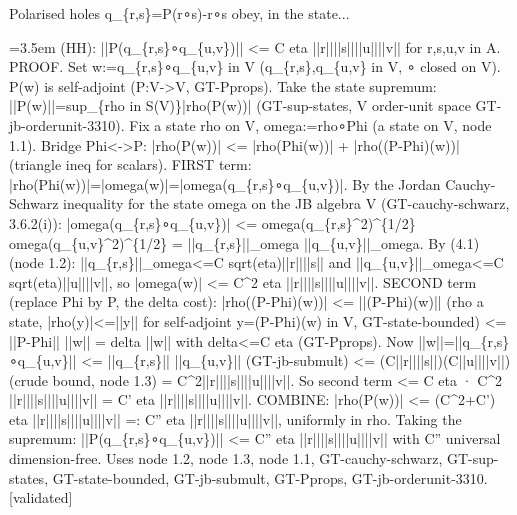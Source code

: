 \documentclass{article}
\newcommand{\step}[1]{\par\noindent\hangindent=3.5em\hangafter=1%
  \makebox[3.5em][l]{\textbf{#1.}}}
\newcommand{\steptag}[1]{\hfill{\small\textsf{[#1]}}}
\begin{document}
\begin{proofbox}{Polarised holes q\_\{r,s\}=P(r∘s)-r∘s obey, in the state...}
\step{1.4} (HH): ||P(q\_\{r,s\}∘q\_\{u,v\})|| <= C eta ||r||||s||||u||||v|| for r,s,u,v in A. PROOF. Set w:=q\_\{r,s\}∘q\_\{u,v\} in V (q\_\{r,s\},q\_\{u,v\} in V, ∘ closed on V). P(w) is self-adjoint (P:V->V, GT-Pprops). Take the state supremum: ||P(w)||=sup\_\{rho in S(V)\}|rho(P(w))| (GT-sup-states, V order-unit space GT-jb-orderunit-3310). Fix a state rho on V, omega:=rho∘Phi (a state on V, node 1.1). Bridge Phi<->P: |rho(P(w))| <= |rho(Phi(w))| + |rho((P-Phi)(w))| (triangle ineq for scalars). FIRST term: |rho(Phi(w))|=|omega(w)|=|omega(q\_\{r,s\}∘q\_\{u,v\})|. By the Jordan Cauchy-Schwarz inequality for the state omega on the JB algebra V (GT-cauchy-schwarz, 3.6.2(i)): |omega(q\_\{r,s\}∘q\_\{u,v\})| <= omega(q\_\{r,s\}\textasciicircum{}2)\textasciicircum{}\{1/2\} omega(q\_\{u,v\}\textasciicircum{}2)\textasciicircum{}\{1/2\} = ||q\_\{r,s\}||\_omega ||q\_\{u,v\}||\_omega. By (4.1) (node 1.2): ||q\_\{r,s\}||\_omega<=C sqrt(eta)||r||||s|| and ||q\_\{u,v\}||\_omega<=C sqrt(eta)||u||||v||, so |omega(w)| <= C\textasciicircum{}2 eta ||r||||s||||u||||v||. SECOND term (replace Phi by P, the delta cost): |rho((P-Phi)(w))| <= ||(P-Phi)(w)|| (rho a state, |rho(y)|<=||y|| for self-adjoint y=(P-Phi)(w) in V, GT-state-bounded) <= ||P-Phi|| ||w|| = delta ||w|| with delta<=C eta (GT-Pprops). Now ||w||=||q\_\{r,s\}∘q\_\{u,v\}|| <= ||q\_\{r,s\}|| ||q\_\{u,v\}|| (GT-jb-submult) <= (C||r||||s||)(C||u||||v||) (crude bound, node 1.3) = C\textasciicircum{}2||r||||s||||u||||v||. So second term <= C eta · C\textasciicircum{}2 ||r||||s||||u||||v|| = C' eta ||r||||s||||u||||v||. COMBINE: |rho(P(w))| <= (C\textasciicircum{}2+C') eta ||r||||s||||u||||v|| =: C'' eta ||r||||s||||u||||v||, uniformly in rho. Taking the supremum: ||P(q\_\{r,s\}∘q\_\{u,v\})|| <= C'' eta ||r||||s||||u||||v|| with C'' universal dimension-free. Uses node 1.2, node 1.3, node 1.1, GT-cauchy-schwarz, GT-sup-states, GT-state-bounded, GT-jb-submult, GT-Pprops, GT-jb-orderunit-3310. \steptag{validated} \\[4pt]

\end{proofbox}
\end{document}
